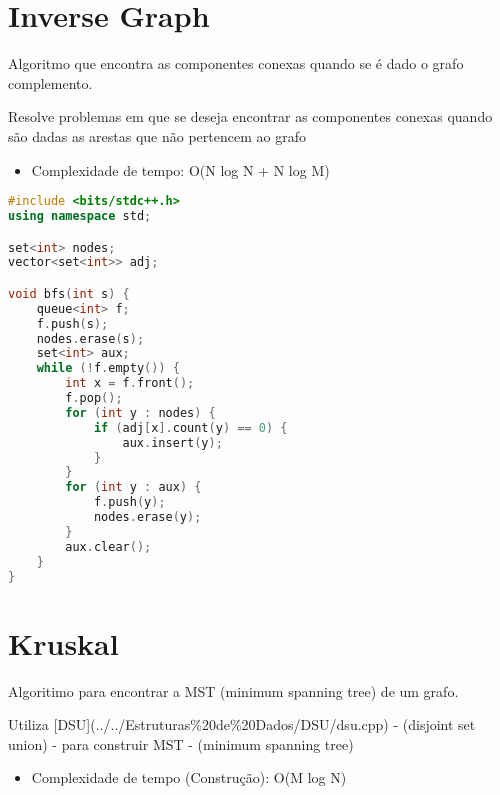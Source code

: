 \documentclass[11pt, a4paper, oneside]{book}
\begin{document}
\hfill

\section{Inverse Graph}


Algoritmo que encontra as componentes conexas quando se é dado o grafo complemento.



Resolve problemas em que se deseja encontrar as componentes conexas quando são dadas as arestas que não pertencem ao grafo



\begin{itemize}
\item Complexidade de tempo: O(N log N + N log M)
\end{itemize}

\hfill

\begin{multicols}{2}
\begin{lstlisting}[language=C++]
#include <bits/stdc++.h>
using namespace std;

set<int> nodes;
vector<set<int>> adj;

void bfs(int s) {
    queue<int> f;
    f.push(s);
    nodes.erase(s);
    set<int> aux;
    while (!f.empty()) {
        int x = f.front();
        f.pop();
        for (int y : nodes) {
            if (adj[x].count(y) == 0) {
                aux.insert(y);
            }
        }
        for (int y : aux) {
            f.push(y);
            nodes.erase(y);
        }
        aux.clear();
    }
}
\end{lstlisting}
\end{multicols}

\hfill

\section{Kruskal}


Algoritimo para encontrar a MST (minimum spanning tree) de um grafo.



Utiliza [DSU](../../Estruturas\%20de\%20Dados/DSU/dsu.cpp) - (disjoint set union) - para construir MST - (minimum spanning tree)



\begin{itemize}
\item Complexidade de tempo (Construção): O(M log N)
\end{itemize}
\end{document}
